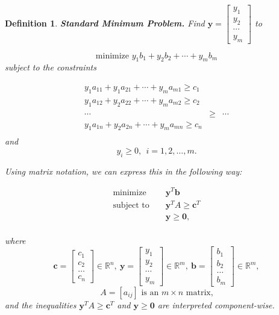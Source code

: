 \documentclass[letterpaper,10pt]{article}
\newcommand{\bvec}[1]{\ensuremath{\mathbf{#1}}}
\newtheorem{df}{Definition}[section]
\begin{document}
\begin{df}{\bf Standard Minimum Problem.}  Find $\displaystyle \bvec{y}=\left[\begin{array}{c}y_1\\y_2\\\cdots\\y_m\end{array}\right]$ to 

$$\text{minimize }y_1b_1+y_2b_2+\cdots+y_mb_m$$ subject to the constraints

\begin{eqnarray*}
y_1a_{11}+y_1a_{21}+\cdots+y_ma_{m1}\geq c_1\\
y_1a_{12}+y_2a_{22}+\cdots+y_ma_{m2}\geq c_2\\
\cdots&\geq&\cdots\\
y_1a_{1n}+y_2a_{2n}+\cdots+y_ma_{mn}\geq c_n\\
\end{eqnarray*}
 and $$y_i\geq 0,~~i=1,2,\ldots,m.$$

\noindent Using matrix notation, we can express this in the following way:

\begin{eqnarray*}
\text{minimize }&&\bvec{y}^T\bvec{b}\\
\text{subject to }&&\bvec{y}^TA\geq \bvec{c}^T\\
&&\bvec{y}\geq \bvec{0},\\
\end{eqnarray*}

\noindent where $$\bvec{c}=\left[\begin{array}{c}c_1\\c_2\\\ldots\\c_n\end{array}\right]\in\mathbb{R}^n,~\bvec{y}=\left[\begin{array}{c}y_1\\y_2\\\cdots\\y_m\end{array}\right]\in\mathbb{R}^m,~\bvec{b}=\left[\begin{array}{c}b_1\\b_2\\\ldots\\b_m\end{array}\right]\in\mathbb{R}^m,$$ $$A=\left[a_{ij}\right]\text{ is an }m\times n\text{ matrix,}$$ and the inequalities $\bvec{y}^TA\geq \bvec{c}^T$ and $\bvec{y}\geq\bvec{0}$ are interpreted component-wise.

\end{df}
\end{document}
